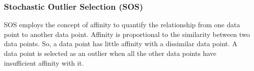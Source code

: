 \subsubsection{Stochastic Outlier Selection (SOS)}
\label{subsubsec:introduction:related-works:sos}
SOS employs the concept of affinity to quantify the relationship from one data point to another data point.
Affinity is proportional to the similarity between two data points.
So, a data point has little affinity with a dissimilar data point.
A data point is selected as an outlier when all the other data points have insufficient affinity with it.
\cite{janssens2012sos}






